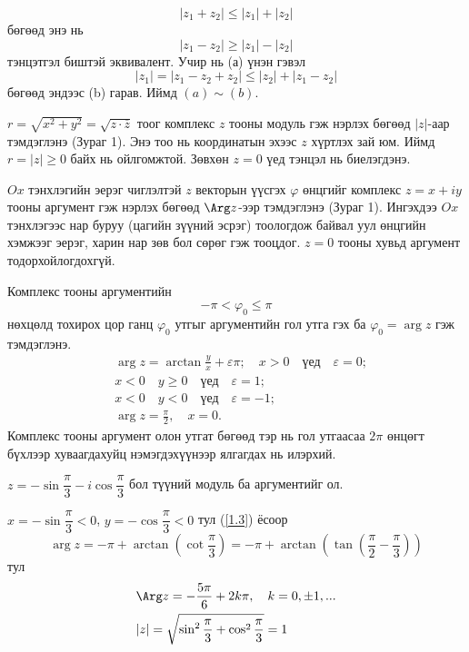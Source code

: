 \begin{equation}
\tag{a}
    |z_1+z_2|\leq |z_1|+|z_2|
\end{equation} бөгөөд энэ нь
\begin{equation}
\tag{b}
    |z_1-z_2|\geq |z_1|-|z_2|
\end{equation} тэнцэтгэл биштэй эквивалент. Учир нь (а) үнэн гэвэл $$|z_1|=|z_1-z_2+z_2|\leq |z_2|+|z_1-z_2|$$
 бөгөөд эндээс (b) гарав. Иймд $(a)\sim (b).$
\begin{dfn}
$r=\sqrt{x^2+y^2}=\sqrt{z\cdot \overline{z}}$ тоог комплекс $z$ тооны модуль гэж нэрлэх бөгөөд $|z|$-аар тэмдэглэнэ (Зураг 1). Энэ тоо нь координатын эхээс $z$ хүртлэх зай юм. Иймд $r=|z|\geq 0$ байх нь ойлгомжтой. Зөвхөн $z=0$ үед тэнцэл нь биелэгдэнэ.    
\end{dfn}
\begin{dfn}
$Ox$ тэнхлэгийн эерэг чиглэлтэй $z$ векторын үүсгэх $\varphi$ өнцгийг комплекс $z=x+iy$ тооны аргумент гэж нэрлэх бөгөөд $\Arg  z$-ээр тэмдэглэнэ (Зураг 1). Ингэхдээ $Ox$ тэнхлэгээс нар буруу (цагийн зүүний эсрэг) тоологдож байвал уул өнцгийн хэмжээг эерэг, харин нар зөв бол сөрөг гэж тооцдог. $z=0$ тооны хувьд аргумент тодорхойлогдохгүй.
\end{dfn}
Комплекс тооны аргументийн
$$-\pi <\varphi_0\leq \pi$$
нөхцөлд тохирох цор ганц $\varphi_0$ утгыг аргументийн гол утга гэх ба $\varphi_0=\arg  z$ гэж тэмдэглэнэ.
\begin{equation} \label{1.3}
\begin{split}
    &\arg  z=\arctan \frac{y}{x}+\varepsilon \pi; \quad x>0 \quad \text{үед} \quad \varepsilon=0;\\
    &x<0\quad y\geq 0 \quad \text{үед} \quad \varepsilon=1; \\
    &x<0\quad y< 0 \quad \text{үед} \quad \varepsilon=-1; \\
    &\arg  z=\frac{\pi}{2}, \quad x=0.
\end{split}
\end{equation}
Комплекс тооны аргумент олон утгат бөгөөд тэр нь гол утгаасаа $2\pi$ өнцөгт бүхлээр хуваагдахуйц нэмэгдэхүүнээр ялгагдах нь илэрхий. 
\begin{exm}
$z=-\sin\dfrac{\pi}{3}-i\cos \dfrac{\pi}{3}$ бол түүний модуль ба аргументийг ол.
\end{exm}
\begin{sol}
$x=-\sin \dfrac{\pi}{3}<0$, $y=-\cos \dfrac{\pi}{3}<0$ тул (\ref{1.3}) ёсоор 
$$\arg  z =-\pi +\arctan \left(\cot\frac{\pi}{3}\right) =-\pi +\arctan \left(\tan \left(\frac{\pi}{2}-\frac{\pi}{3}\right)\right)$$ тул
\begin{align*}
    &\Arg z=-\frac{5\pi}{6}+2k\pi , \quad k=0,\pm 1,... \\
    & |z|=\sqrt{\sin^2\frac{\pi}{3}+\cos^2\frac{\pi}{3}}=1
\end{align*}
\end{sol}


